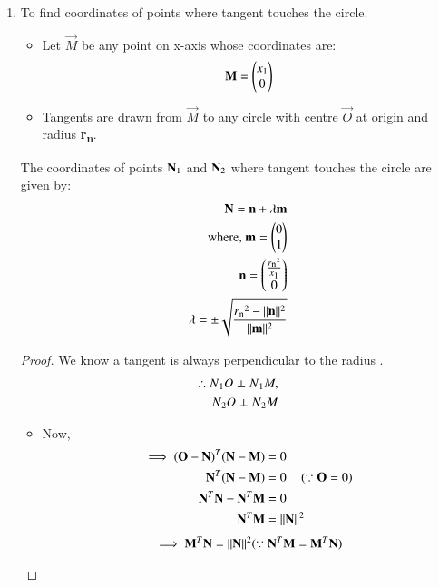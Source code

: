 \documentclass[journal,12pt,twocolumn]{IEEEtran}
\begin{document}
\begin{enumerate}
    \item To find coordinates of points where tangent touches the circle.
\begin{itemize}
    \item Let $\vec{M}$ be any point on x-axis whose coordinates are:
    \begin{align}
    \vec{M} =\myvec{x\textsubscript{1} \\0} \label{eq1}
    \end{align}
    \item Tangents are drawn from $\vec{M}$ to any circle with centre $\vec{O}$ at origin and radius \textbf{r\textsubscript{n}}.
\end{itemize}
\begin{lemma}
\label{lemma}
The coordinates of points $\vec{N\textsubscript{1}}$ and $\vec{N\textsubscript{2}}$ where tangent touches the circle are given by:
\begin{align}
\vec{N}=\vec{n}+\lambda \vec{m} \label{eq2}
\\
\text{where, }\vec{m}=\myvec{0\\1} 
\\
\vec{n}=\myvec{\frac{r\textsubscript{n}^2}{x\textsubscript{1}}\\0}
\\
\lambda = \pm\sqrt{\frac{r\textsubscript{n}^2-\norm{\vec{n}}^2}{\norm{\vec{m}}^2}}
\end{align}
\end{lemma}
\begin{proof}
We know a tangent is always perpendicular to the radius .
\begin{align}
\therefore N\textsubscript{1}O \perp N\textsubscript{1}M, 
\\
N\textsubscript{2}O \perp N\textsubscript{2}M
\end{align}
\begin{itemize}
\item Now,
\begin{align}
 \implies (\vec{O}-\vec{N})^T (\vec{N}-\vec{M}) &= 0
 \\
 \vec{N}^T(\vec{N}-\vec{M})&= 0 \quad \brak{\because \vec{O}=0}
 \\
  \vec{N}^T \vec{N} - \vec{N}^T \vec{M} &= 0  
  \\
   \vec{N}^T \vec{M} &=\norm{\vec{N}}^2
  \end{align}
 \begin{align}
  \implies\vec{M}^T \vec{N} =\norm{\vec{N}}^2 (\because \vec{N}^T \vec{M}=\vec{M}^T \vec{N}) 

\end{align}
\end{itemize}
\end{proof}
\end{enumerate}
\end{document}
